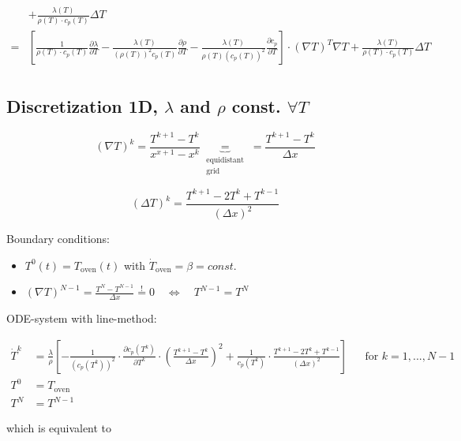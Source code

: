 \documentclass{scrartcl}[12pt, halfparskip]
\begin{document}
\begin{align*}
	& + \frac{\lambda (T)}{\rho (T) \cdot c_p (T)} \Delta T \\
	= & \left[ \frac{1}{\rho (T) \cdot c_p (T)} \frac{\partial \lambda}{\partial T} - \frac{\lambda (T)}{(\rho(T))^2 c_p(T)} \frac{\partial \rho}{\partial T} - \frac{\lambda (T)}{\rho(T) (c_p(T))^2} \frac{\partial c_p}{\partial T} \right] \cdot (\nabla T)^T \nabla T + \frac{\lambda (T)}{\rho (T) \cdot c_p (T)} \Delta T \\
\end{align*}

\subsection{Discretization 1D, $\lambda$ and $\rho$ const. $\forall T$}

\begin{equation*}
	(\nabla T)^k = \frac{T^{k+1} - T^k}{x^{x+1} - x^k} \underbrace{=}_{\substack{\text{equidistant} \\ \text{grid}}} =  \frac{T^{k+1} - T^k}{\Delta x}
\end{equation*}

\begin{equation*}
	(\Delta T)^k = \frac{T^{k+1} - 2 T^k + T^{k-1}}{(\Delta x)^2}
\end{equation*}

Boundary conditions:

\begin{itemize}
	\item $T^0(t) = T_{\text{oven}}(t)$ \quad with \quad $\dot{ T}_{\text{oven}}= \beta = const.$
	\item $(\nabla T)^{N-1} = \frac{T^{N} - T^{N-1}}{\Delta x} \stackrel{!}{=} 0 \quad \Leftrightarrow \quad T^{N-1} = T^N$ 
\end{itemize}

ODE-system with line-method:

\begin{align*}
	\dot{T}^k & = \frac{\lambda}{\rho} \left[ - \frac{1}{(c_p(T^k))^2} \cdot \frac{\partial c_p(T^k)}{\partial T^k} \cdot \left( \frac{T^{k+1} - T^k}{\Delta x} \right)^2 + \frac{1}{c_p(T^k)} \cdot \frac{T^{k+1} - 2 T^k + T^{k-1}}{(\Delta x)^2} \right] & & \text{for } k = 1, ..., N-1 \\
	T^0 & = T_{\text{oven}} \\
	T^N & = T^{N-1}
\end{align*}

which is equivalent to
\end{document}
